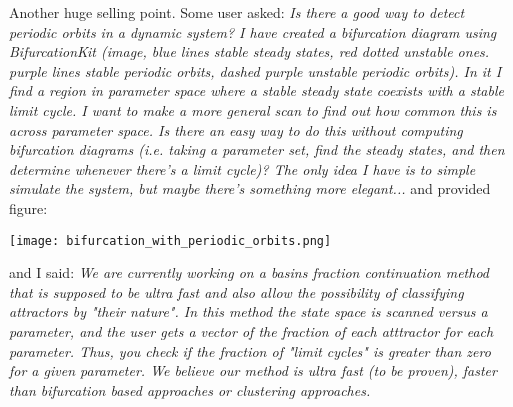 \documentclass{article}
\begin{document}
Another huge selling point. Some user asked:
\textit{Is there a good way to detect periodic orbits in a dynamic system?
I have created a bifurcation diagram using BifurcationKit (image, blue lines stable steady states, red dotted unstable ones. purple lines stable periodic orbits, dashed purple unstable periodic orbits). In it I find a region in parameter space where a stable steady state coexists with a stable limit cycle. I want to make a more general scan to find out how common this is across parameter space.
Is there an easy way to do this without computing bifurcation diagrams (i.e. taking a parameter set, find the steady states, and then determine whenever there's a limit cycle)? The only idea I have is to simple simulate the system, but maybe there's something more elegant...
} and provided figure:

\texttt{[image: bifurcation\_with\_periodic\_orbits.png]}

and I said: \textit{We are currently working on a basins fraction continuation method that is supposed to be ultra fast and also allow the possibility of classifying attractors by "their nature". In this method the state space is scanned versus a parameter, and the user gets a vector of the fraction of each atttractor for each parameter. Thus, you check if the fraction of "limit cycles" is greater than zero for a given parameter. We believe our method is ultra fast (to be proven), faster than bifurcation based approaches or clustering approaches.}


\end{document}
